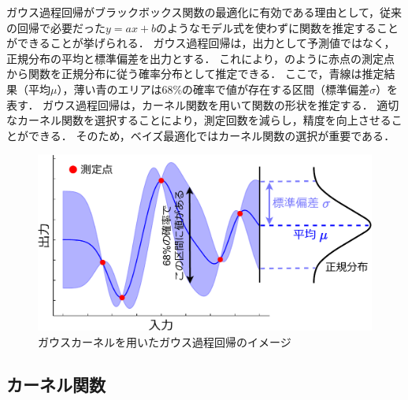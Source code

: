 \documentclass[twocolumn]{ltjarticle}
\begin{document}
ガウス過程回帰がブラックボックス関数の最適化に有効である理由として，従来の回帰で必要だった\(y=ax+b\)のようなモデル式を使わずに関数を推定することができることが挙げられる．
ガウス過程回帰は，出力として予測値ではなく，正規分布の平均と標準偏差を出力とする．
これにより，のように赤点の測定点から関数を正規分布に従う確率分布として推定できる．
ここで，青線は推定結果（平均\(\mu\)），薄い青のエリアは68\%の確率で値が存在する区間（標準偏差\(\sigma\)）を表す．
ガウス過程回帰は，カーネル関数を用いて関数の形状を推定する．
適切なカーネル関数を選択することにより，測定回数を減らし，精度を向上させることができる．
そのため，ベイズ最適化ではカーネル関数の選択が重要である\cite{gaussian_process}．
\setlength\intextsep{3pt}
\setlength\textfloatsep{3pt}
\begin{figure}[htbp]
	\centering
	\includegraphics[width=0.83\linewidth]{./figures/material_5_kernel_v2.pdf}
	\vspace*{-0.3cm}
	\caption{ガウスカーネルを用いたガウス過程回帰のイメージ} \label{fig:gaussian_process}
\end{figure}
\subsection{カーネル関数}
\end{document}
